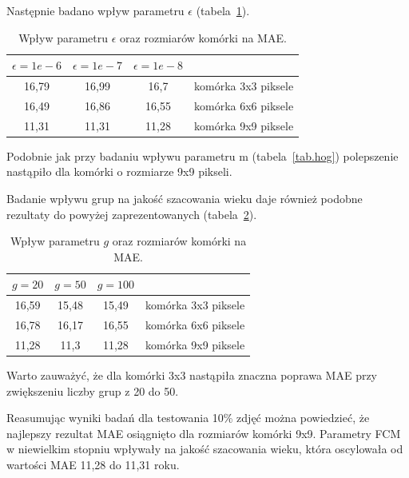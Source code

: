 \documentclass[a4paper,twoside,12pt]{book}
\begin{document}
    Następnie badano wpływ parametru $\epsilon$ (tabela~\ref{tab.hog1}).
    \begin{table}[h!]
        \centering
        \caption{Wpływ parametru $\epsilon$ oraz rozmiarów komórki na MAE.}
        \begin{tabular}{|c|c|c|c|}
            \hline
            $\epsilon=1e-6$ &  $\epsilon=1e-7$ &  $\epsilon=1e-8$ &                     \\ \hline
            16,79 & 16,99 & 16,7 & komórka 3x3 piksele \\ \hline
            16,49 & 16,86 & 16,55 & komórka 6x6 piksele \\ \hline
            11,31 & 11,31 & 11,28 & komórka 9x9 piksele \\ \hline
        \end{tabular}
        \label{tab.hog1}
    \end{table}

    Podobnie jak przy badaniu wpływu parametru m (tabela~\ref{tab.hog}) polepszenie nastąpiło dla komórki o rozmiarze
    9x9 pikseli.

    Badanie wpływu grup na jakość szacowania wieku daje również podobne rezultaty do powyżej zaprezentowanych
    (tabela~\ref{tab.hog2}).
    \begin{table}[h!]
        \centering
        \caption{Wpływ parametru $g$ oraz rozmiarów komórki na MAE.}
        \begin{tabular}{|c|c|c|c|}
            \hline
            $g=20$ & $g=50$ & $g=100$ &                     \\ \hline
            16,59 & 15,48 & 15,49 & komórka 3x3 piksele \\ \hline
            16,78 & 16,17 & 16,55 & komórka 6x6 piksele \\ \hline
            11,28 & 11,3 & 11,28 & komórka 9x9 piksele \\ \hline
        \end{tabular}
        \label{tab.hog2}
    \end{table}

    Warto zauważyć, że dla komórki 3x3 nastąpiła znaczna poprawa MAE przy zwiększeniu liczby grup z 20 do 50.

    Reasumując wyniki badań dla testowania 10\% zdjęć można powiedzieć, że najlepszy rezultat MAE osiągnięto dla
    rozmiarów komórki 9x9. Parametry FCM w niewielkim stopniu wpływały na jakość szacowania wieku, która oscylowała
    od wartości MAE 11,28 do 11,31 roku.
\end{document}
